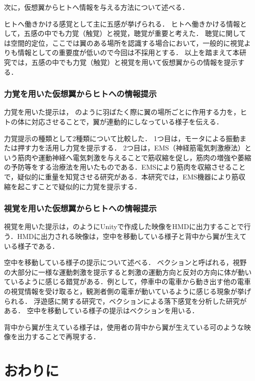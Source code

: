 

    次に，仮想翼からヒトへ情報を与える方法について述べる．

    ヒトへ働きかける感覚として主に五感が挙げられる．
    ヒトへ働きかける情報として，五感の中でも力覚（触覚）と視覚，聴覚が重要と考えた．
    聴覚に関しては空間的定位，ここでは翼のある場所を認識する場合において，一般的に視覚よりも情報としての重要度が低い\cite{岡嶋克典20182}ので今回は不採用とする．
    以上を踏まえて本研究では，五感の中でも力覚（触覚）と視覚を用いて仮想翼からの情報を提示する．

    \subsubsection{力覚を用いた仮想翼からヒトへの情報提示}

        力覚を用いた提示は，
        のように羽ばたく際に翼の場所ごとに作用する力を，ヒトの体に対応させることで，翼が連動的にしなっている様子を伝える．

        力覚提示の種類として2種類について比較した．
        1つ目は，モータによる振動または押す力を活用し力覚を提示する．
        2つ目は，EMS（神経筋電気刺激療法）という筋肉や運動神経へ電気刺激を与えることで筋収縮を促し，筋肉の増強や萎縮の予防等をする治療法を用いたものである．EMSにより筋肉を収縮させることで，疑似的に重量を知覚させる研究がある\cite{小川剛史2017電気的筋肉刺激が重量知覚に及ぼす影響の分析}．本研究では，EMS機器により筋収縮を起こすことで疑似的に力覚を提示する．
    
    \subsubsection{視覚を用いた仮想翼からヒトへの情報提示}
 
        視覚を用いた提示は，のようにUnityで作成した映像をHMDに出力することで行う．HMDに出力される映像は，空中を移動している様子と背中から翼が生えている様子である．

        空中を移動している様子の提示について述べる．
        ベクションと呼ばれる，視野の大部分に一様な運動刺激を提示すると刺激の運動方向と反対の方向に体が動いているように感じる錯覚がある\cite{妹尾武治2014ベクションとその周辺の近年の動向}．例として，停車中の電車から動き出す他の電車の視覚情報を受け取ると，観測者側の電車が動いているように感じる現象が挙げられる．
        浮遊感に関する研究で，ベクションによる落下感覚を分析した研究がある\cite{奥川夏輝2017VR空間における視覚刺激によって発生する落下感覚の分析}．
        空中を移動している様子の提示はベクションを用いる．

        背中から翼が生えている様子は，使用者の背中から翼が生えている可のような映像を出力することで再現する．  





\section{おわりに}